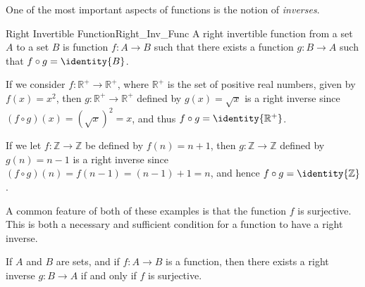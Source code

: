         One of the most important aspects of functions is the notion of
        \textit{inverses}.
        \begin{fdefinition}{Right Invertible Function}{Right_Inv_Func}
            A right invertible function from a set $A$ to a set $B$ is function
            $f:A\rightarrow{B}$ such that there exists a function
            $g:B\rightarrow{A}$ such that $f\circ{g}=\identity{B}$.
        \end{fdefinition}
        \begin{example}
            If we consider $f:\mathbb{R}^{+}\rightarrow\mathbb{R}^{+}$, where
            $\mathbb{R}^{+}$ is the set of positive real numbers, given by
            $f(x)=x^{2}$, then $g:\mathbb{R}^{+}\rightarrow\mathbb{R}^{+}$
            defined by $g(x)=\sqrt{x}$ is a right inverse since
            $(f\circ{g})(x)=(\sqrt{x})^{2}=x$, and thus
            $f\circ{g}=\identity{\mathbb{R}^{+}}$.
        \end{example}
        \begin{example}
            If we let $f:\mathbb{Z}\rightarrow\mathbb{Z}$ be defined by
            $f(n)=n+1$, then $g:\mathbb{Z}\rightarrow\mathbb{Z}$ defined by
            $g(n)=n-1$ is a right inverse since
            $(f\circ{g})(n)=f(n-1)=(n-1)+1=n$, and hence
            $f\circ{g}=\identity{\mathbb{Z}}$.
        \end{example}
        A common feature of both of these examples is that the function $f$ is
        surjective. This is both a necessary and sufficient condition for a
        function to have a right inverse.
        \begin{theorem}
            \label{thm:Right_Inv_iff_Surj}%
            If $A$ and $B$ are sets, and if $f:A\rightarrow{B}$ is a function,
            then there exists a right inverse $g:B\rightarrow{A}$ if and only
            if $f$ is surjective.
        \end{theorem}
